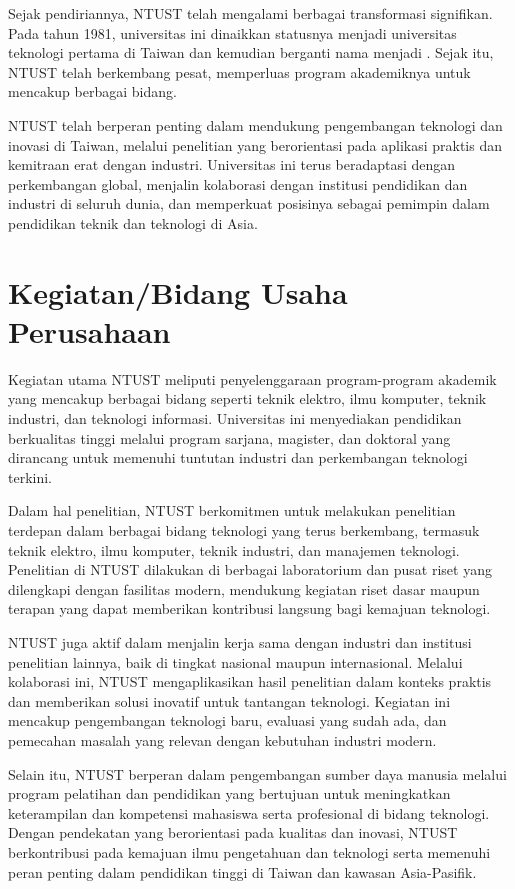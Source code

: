 Sejak pendiriannya, NTUST telah mengalami berbagai transformasi signifikan. Pada tahun 1981, universitas ini dinaikkan statusnya menjadi universitas teknologi pertama di Taiwan dan kemudian berganti nama menjadi \namaUniv. Sejak itu, NTUST telah berkembang pesat, memperluas program akademiknya untuk mencakup berbagai bidang.

NTUST telah berperan penting dalam mendukung pengembangan teknologi dan inovasi di Taiwan, melalui penelitian yang berorientasi pada aplikasi praktis dan kemitraan erat dengan industri. Universitas ini terus beradaptasi dengan perkembangan global, menjalin kolaborasi dengan institusi pendidikan dan industri di seluruh dunia, dan memperkuat posisinya sebagai pemimpin dalam pendidikan teknik dan teknologi di Asia.

\section{Kegiatan/Bidang Usaha Perusahaan}

Kegiatan utama NTUST meliputi penyelenggaraan program-program akademik yang mencakup berbagai bidang seperti teknik elektro, ilmu komputer, teknik industri, dan teknologi informasi. Universitas ini menyediakan pendidikan berkualitas tinggi melalui program sarjana, magister, dan doktoral yang dirancang untuk memenuhi tuntutan industri dan perkembangan teknologi terkini.

Dalam hal penelitian, NTUST berkomitmen untuk melakukan penelitian terdepan dalam berbagai bidang teknologi yang terus berkembang, termasuk teknik elektro, ilmu komputer, teknik industri, dan manajemen teknologi. Penelitian di NTUST dilakukan di berbagai laboratorium dan pusat riset yang dilengkapi dengan fasilitas modern, mendukung kegiatan riset dasar maupun terapan yang dapat memberikan kontribusi langsung bagi kemajuan teknologi.

NTUST juga aktif dalam menjalin kerja sama dengan industri dan institusi penelitian lainnya, baik di tingkat nasional maupun internasional. Melalui kolaborasi ini, NTUST mengaplikasikan hasil penelitian dalam konteks praktis dan memberikan solusi inovatif untuk tantangan teknologi. Kegiatan ini mencakup pengembangan teknologi baru, evaluasi yang sudah ada, dan pemecahan masalah yang relevan dengan kebutuhan industri modern.

Selain itu, NTUST berperan dalam pengembangan sumber daya manusia melalui program pelatihan dan pendidikan yang bertujuan untuk meningkatkan keterampilan dan kompetensi mahasiswa serta profesional di bidang teknologi. Dengan pendekatan yang berorientasi pada kualitas dan inovasi, NTUST berkontribusi pada kemajuan ilmu pengetahuan dan teknologi serta memenuhi peran penting dalam pendidikan tinggi di Taiwan dan kawasan Asia-Pasifik.

